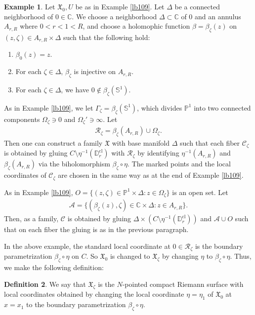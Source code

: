 \documentclass[11pt,b5paper,notitlepage]{article}
\theoremstyle{definition}
\newtheorem{df}{Definition}[section]
\newtheorem{eg}[df]{Example}
\theoremstyle{plain}
\newcommand{\fk}{\mathfrak}
\newcommand{\mc}{\mathcal}
\newcommand{\Cbb}{\mathbb C}
\newcommand{\Pbb}{\mathbb P}
\newcommand{\Dbb}{\mathbb D}
\newcommand{\Sbb}{{\mathbb S}}
\newcommand{\cl}{\mathrm{cl}}
\numberwithin{equation}{section}
\begin{document}
\begin{eg}\label{lb111}
Let $\fk X_0,U$ be as in Example \ref{lb109}. Let $\Delta$ be a connected neighborhood of $0\in\Cbb$. We choose a neighborhood $\Delta\subset\Cbb$ of $0$ and an annulus $A_{r,R}$ where $0<r<1<R$, and choose a holomophic function $\beta=\beta_\zeta(z)$ on $(z,\zeta)\in A_{r,R}\times\Delta$ such that the following hold:
\begin{enumerate}
\item $\beta_0(z)=z$.
\item For each $\zeta\in\Delta$, $\beta_\zeta$ is injective on $A_{r,R}$.
\item For each $\zeta\in\Delta$, we have $0\notin\beta_\zeta(\Sbb^1)$.
\end{enumerate}

As in Example \ref{lb109}, we let $\Gamma_\zeta=\beta_\zeta(\Sbb^1)$, which divides $\Pbb^1$ into two connected components $\Omega_\zeta\ni 0$ and $\Omega_\zeta'\ni\infty$. Let
\begin{align*}
\mc R_\zeta=\beta_\zeta(A_{r,R})\cup\Omega_\zeta.
\end{align*}
Then one can construct a family $\fk X$ with base manifold $\Delta$ such that each fiber $\mc C_\zeta$ is obtained by gluing $C\setminus\eta^{-1}(\Dbb_r^\cl)$ with $\mc R_\zeta$ by identifying $\eta^{-1}(A_{r,R})$ and $\beta_\zeta(A_{r,R})$ via the biholomorphism $\beta_\zeta\circ\eta$. The marked points and the local coordinates of $\mc C_\zeta$ are chosen in the same way as at the end of Example \ref{lb109}. 

As in Example \ref{lb109}, $O=\{(z,\zeta)\in\Pbb^1\times\Delta:z\in\Omega_\zeta\}$ is an open set. Let
\begin{align*}
\mc A=\{(\beta_\zeta(z),\zeta)\in \Cbb\times\Delta:z\in A_{r,R}\}.
\end{align*}
Then, as a family, $\mc C$ is obtained by gluing $\Delta\times(C\setminus\eta^{-1}(\Dbb_r^\cl))$ and $\mc A\cup O$ such that on each fiber the gluing is as in the previous paragraph. \hfill\qedsymbol
\end{eg}

In the above example, the standard local coordinate at $0\in\mc R_\zeta$ is the boundary parametrization $\beta_\zeta\circ\eta$ on $C$. So $\fk X_0$ is changed to $\fk X_\zeta$ by changing $\eta$ to $\beta_\zeta\circ\eta$. Thus, we make the following definition:
\begin{df}\label{lb115}
We say that $\fk X_\zeta$ is the $N$-pointed compact Riemann surface with local coordinates obtained by changing the local coordinate $\eta=\eta_1$ of $\fk X_0$ at $x=x_1$ to the boundary parametrization $\beta_\zeta\circ\eta$.
\end{df}
\end{document}
